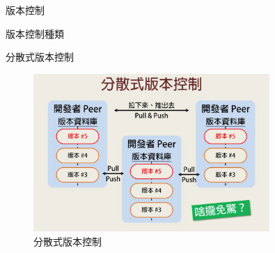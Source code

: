 \documentclass[pdf,16pt]{beamer}
\begin{document}
\begin{section}{版本控制}
\begin{subsection}{版本控制種類}
      \begin{frame}{分散式版本控制}
        \begin{figure}[h!]
          \includegraphics[width=0.8\textwidth]{images/003.jpg} 
          \caption{分散式版本控制}
        \end{figure}
      \end{frame}
    \end{subsection}
  \end{section}
\end{document}
